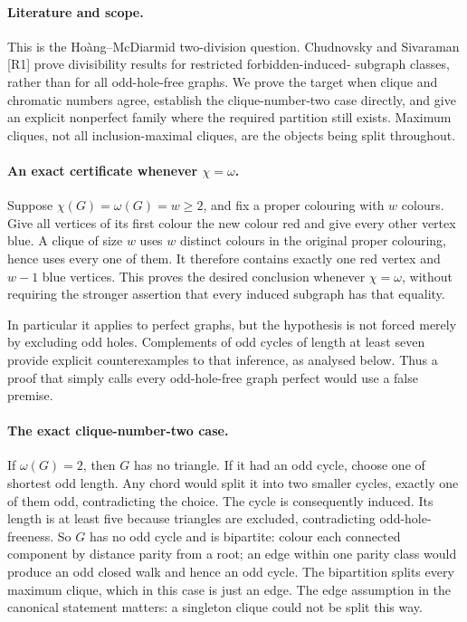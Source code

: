 \documentclass[11pt,a4paper]{article}
\begin{document}
\paragraph{Literature and scope.}
This is the Ho\`ang--McDiarmid two-division question. Chudnovsky and
Sivaraman [R1] prove divisibility results for restricted forbidden-induced-
subgraph classes, rather than for all odd-hole-free graphs. We prove
the target when clique and chromatic numbers agree, establish the
clique-number-two case directly, and give an explicit nonperfect family
where the required partition still exists. Maximum cliques, not all
inclusion-maximal cliques, are the objects being split throughout.

\paragraph{An exact certificate whenever $\chi=\omega$.}
Suppose $\chi(G)=\omega(G)=w\ge2$, and fix a proper colouring
with $w$ colours. Give all vertices of its first colour the new
colour red and give every other vertex blue. A clique of size $w$
uses $w$ distinct colours in the original proper colouring, hence
uses every one of them. It therefore contains exactly one red vertex
and $w-1$ blue vertices. This proves the desired conclusion whenever
$\chi=\omega$, without requiring the stronger assertion that every
induced subgraph has that equality.

In particular it applies to perfect graphs, but the hypothesis is not
forced merely by excluding odd holes. Complements of odd cycles of
length at least seven provide explicit counterexamples to that inference,
as analysed below. Thus a proof that simply calls every odd-hole-free
graph perfect would use a false premise.

\paragraph{The exact clique-number-two case.}
If $\omega(G)=2$, then $G$ has no triangle. If it had an odd
cycle, choose one of shortest odd length. Any chord would split it
into two smaller cycles, exactly one of them odd, contradicting the
choice. The cycle is consequently induced. Its length is at least
five because triangles are excluded, contradicting odd-hole-freeness.
So $G$ has no odd cycle and is bipartite: colour each connected
component by distance parity from a root; an edge within one parity
class would produce an odd closed walk and hence an odd cycle.
The bipartition splits every maximum clique, which in this case is
just an edge. The edge assumption in the canonical statement matters:
a singleton clique could not be split this way.
\end{document}
